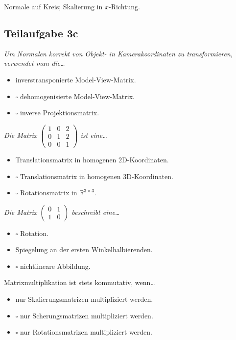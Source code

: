 \documentclass[a4paper]{scrartcl}
\begin{document}
Normale auf Kreis; Skalierung in $x$-Richtung.

\subsection*{Teilaufgabe 3c}
\textit{Um Normalen korrekt von Objekt- in Kamerakoordinaten zu transformieren, verwendet man die\dots}
\begin{itemize}
    \item \CheckedBox inverstransponierte Model-View-Matrix.
    \item $\square$ dehomogenisierte Model-View-Matrix.
    \item $\square$ inverse Projektionsmatrix.
\end{itemize}

\textit{Die Matrix $\begin{pmatrix}1 & 0 & 2\\
                     0 & 1 & 2\\
                     0 & 0 & 1\end{pmatrix}$ ist eine\dots}
\begin{itemize}
    \item \CheckedBox Translationsmatrix in homogenen 2D-Koordinaten.
    \item $\square$ Translationsmatrix in homogenen 3D-Koordinaten.
    \item $\square$ Rotationsmatrix in $\mathbb{R}^{3 \times 3}$.
\end{itemize}

\textit{Die Matrix $\begin{pmatrix}0 & 1\\
                     1 & 0\end{pmatrix}$ beschreibt eine\dots}
\begin{itemize}
    \item $\square$ Rotation.
    \item \CheckedBox Spiegelung an der ersten Winkelhalbierenden.
    \item $\square$ nichtlineare Abbildung.
\end{itemize}

Matrixmultiplikation ist stets kommutativ, wenn\dots
\begin{itemize}
    \item \CheckedBox nur Skalierungsmatrizen multipliziert werden.
    \item $\square$ nur Scherungsmatrizen multipliziert werden.
    \item $\square$ nur Rotationsmatrizen multipliziert werden.
\end{itemize}
\end{document}
